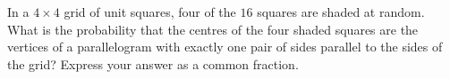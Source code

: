 In a $4\times4$ grid of unit squares, four of the $16$ squares are shaded at random. What is the probability that the centres of the four shaded squares are the vertices of a parallelogram with exactly one pair of sides parallel to the sides of the grid? Express your answer as a common fraction.

